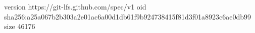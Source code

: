 version https://git-lfs.github.com/spec/v1
oid sha256:a25a067b2b303a2e01ac6a00d1db61f9b924738415f81d3f01a8923c6ae0db99
size 46176
